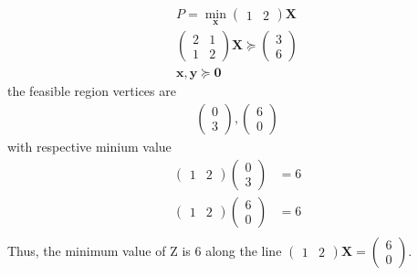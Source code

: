 \documentclass[a4paper,12pt,twocolumn]{article}
\let\vec\mathbf
\newcommand{\myvec}[1]{\ensuremath{\begin{pmatrix}#1\end{pmatrix}}}
\begin{document}
\begin{align}
	P = \min_{\vec{x}}\myvec{1 &2}\vec{X}
	\\
	\myvec{2 &1 \\ 1 & 2} \vec{X}\succeq \myvec{3 \\ 6}
	\\
	\vec{x},\vec{y} \succeq \vec{0}
\end{align}
				the feasible region vertices are
\begin{align}
\myvec{0 \\ 3 },
\myvec{6 \\ 0}
\end{align}
with respective minium value
\begin{align}
	\myvec{1 &2}\myvec{0 \\ 3} &= 6 \\
	\myvec{1 &2}\myvec{6 \\ 0} &= 6 \\
\end{align}
Thus, the minimum value of Z is 6 along the line $\myvec{1 & 2}\vec{X}=\myvec{6 \\ 0}$.
\end{document}
